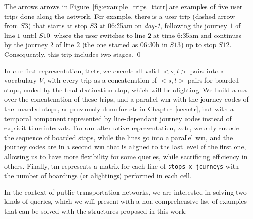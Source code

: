     \begin{example}
    The arrows arrows in Figure~\ref{fig:example_trips_ttctr} are examples of five user trips done along the network.
    For example, there is a user trip (dashed arrow from $S3$) that starts at stop $S3$ at 06:25am on {\em day-1}, 
    following the journey $1$ of line $1$ until $S10$, where the user switches to line $2$ at time 6:35am 
    and continues by the journey $2$ of line $2$ (the one started as 06:30h in $S13$) up to stop $S12$. Consequently, this trip includes two stages.
    \qed
    \end{example}
    
    In our first representation, \gls{ttctr}, we encode all valid $<s,l>$ pairs into a vocabulary $V$, with every trip as a concatenation of $<s,l>$ pairs for boarded stops, ended by the final destination stop, which will be alighting. We build a \gls{csa} over the concatenation of these trips, and a parallel \gls{wm} with the journey codes of the boarded stops, as previously done for \gls{ctr} in Chapter~\ref{sec:ctr}, but with a temporal component represented by line-dependant journey codes instead of explicit time intervals. For our alternative representation, \gls{xctr}, we only encode the sequence of boarded stops, while the lines go into a parallel \gls{wm}, and the journey codes are in a second \gls{wm} that is aligned to the last level of the first one, allowing us to have more flexibility for some queries, while sacrificing efficiency in others. Finally, \gls{tm} represents a matrix for each line of \texttt{stops x journeys} with the number of boardings (or alightings) performed in each cell.
	
	In the context of public transportation networks, we are interested in solving two kinds of queries, which we will present with a non-comprehensive list of examples that can be solved with the structures proposed in this work:

